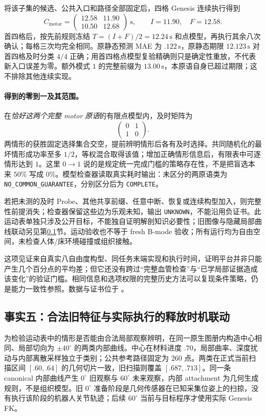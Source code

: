 \documentclass[11pt,a4paper,fontset=fandol]{ctexart}
\theoremstyle{definition}
\theoremstyle{remark}\newtheorem{remark}[theorem]{说明}
\numberwithin{equation}{section}
\begin{document}
将该子集的候选、公共入口和路径全部固定后，四格 Genesis 连续执行得到
\[
 C_{\mathrm{motor}}=\begin{pmatrix}
 12.58&11.90\\10.50&12.68
 \end{pmatrix}\ \mathrm{s},\qquad
 I=11.90,\quad F=12.58.
\]
首四格后，按先前规则冻结 $T=(I+F)/2=12.24\,\mathrm{s}$ 和点模型，再执行其余八次确认；每格三次均完全相同。原静态预测 MAE 为 $.122\,\mathrm{s}$，原静态期限 $12.123\,\mathrm{s}$ 对首四格及时分类 $4/4$ 正确；用首四格点模型复验精确则只是确定性重放，不代表新入口误差为零。额外模式 $1$ 的完整前缀为 $13.00\,\mathrm{s}$，本原语自身已超过期限；这不排除其他连续实现。

\paragraph{得到的零到一及其范围。}
在\emph{恰好这两个完整 motor 原语}的有限点模型内，及时矩阵为
\[
 \begin{pmatrix}0&1\\1&0\end{pmatrix}.
\]
两情形的获胜固定选择集合交空，提前辨明情形后各有及时选择。共同随机化的最坏情形成功率至多 $1/2$，等权混合取得该值；增加正确情形信息后，有限表中可逐情形达到 $1$。这里 $0\!\to\!1$ 说的是规定统一完成门槛的策略存在性，不是把盲选本来 $50\%$ 写成 $0\%$。模型检查器读取真实耗时输出：未区分的两原语类为 \texttt{NO\_COMMON\_GUARANTEE}，分别区分后为 \texttt{COMPLETE}。

若把未测的及时 Probe、其他共享前缀、任意中断、恢复或连续构型加入，则完整性前提消失；检查器保留这些边为乐观未知，输出 \texttt{UNKNOWN}，不能沿用负证书。此运动表单独只涉及公开目标，不能独自证明解剖知识必要性；旧图像与隐藏局部曲线联动另见第\ref{sec:release_linkage}节。运动验收也不等于 fresh B-mode 验收；所有运行均为自由空间，未检查人体/床环境碰撞或组织接触。

这项见证来自真实八自由度构型、同任务末端实现和执行时间，证明平台并非只能产生几个百分点的平均差；但它还没有跨过“完整血管检查”与“已学局部证据造成该变化”的验证门槛。相同信息和选项权限的完整历史方法可以复现条件策略，仍是能力一致性参照。数据与证书位于 。


\subsection{事实五：合法旧特征与实际执行的释放时机联动}
\label{sec:release_linkage}
为检验运动表中的情形是否能由合法局部观察辨明，在同一原生图册内构造中心相同、局部切向为 $\pm40^\circ$ 的两类内部曲线。中心在材料进度 $.70$，局部曲率、深度扰动与内部离散采样独立于类别；公共参考路径固定为 $260$ 点。两类在正式当前扫描区间 $[.60,.64]$ 的几何切片一致，旧扫描则覆盖 $[.687,.713]$。同一条 canonical 内部曲线产生 $0^\circ$ 旧观察与 $60^\circ$ 未来观察，内部 attachment 为几何生成规则，不是组织模型。旧 $0^\circ$ 准备阶段是几何传感器在已知采集位姿上的扫掠，没有执行该阶段的机器人关节轨迹；后续 $60^\circ$ 当前与目标程序才使用实际 Genesis FK。
\end{document}
